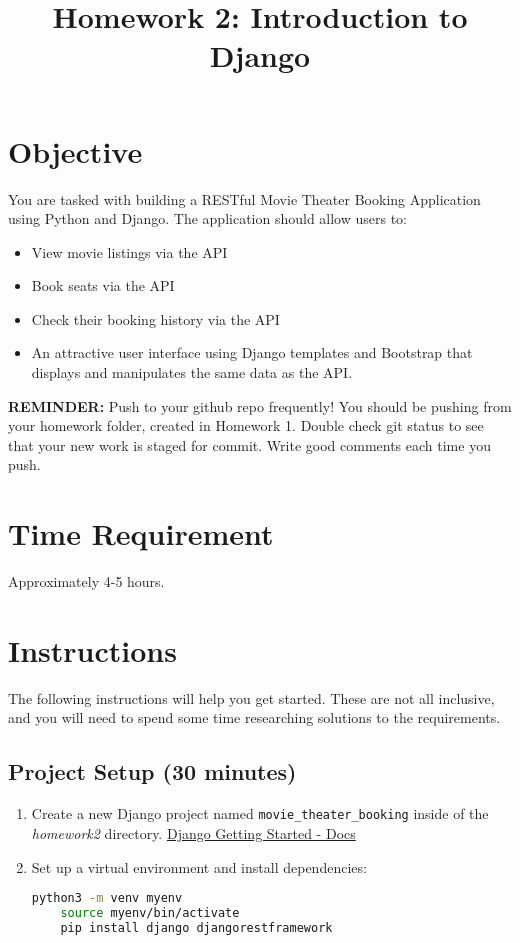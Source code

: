 \documentclass{article}
\title{Homework 2: Introduction to Django}
\author{}
\date{}
\begin{document}
\maketitle

\section{Objective}
You are tasked with building a RESTful Movie Theater Booking Application using Python and Django. The application should allow users to:

\begin{itemize}
    \item View movie listings via the API
    \item Book seats via the API
    \item Check their booking history via the API
    \item An attractive user interface using Django templates and Bootstrap that displays and manipulates the same data as the API.
\end{itemize}


\textbf{REMINDER:} Push to your github repo frequently! You should be pushing from your homework folder, created in Homework 1. Double check git status to see that your new work is staged for commit. Write good comments each time you push.

\section{Time Requirement}
Approximately 4-5 hours.

\section{Instructions}
The following instructions will help you get started. These are not all inclusive, and you will need to spend some time researching solutions to the requirements. 

\subsection{Project Setup (30 minutes)}
\begin{enumerate}
    \item Create a new Django project named \texttt{movie\_theater\_booking} inside of the \textit{homework2} directory. \href{https://docs.djangoproject.com/en/stable/intro/tutorial01/}{Django Getting Started - Docs}
    \item Set up a virtual environment and install dependencies:
    \begin{lstlisting}[style=customcode,language=bash]
    python3 -m venv myenv
    source myenv/bin/activate
    pip install django djangorestframework
    \end{lstlisting}
\end{enumerate}
\end{document}
